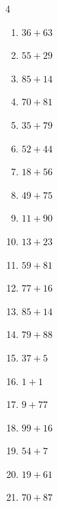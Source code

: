 \begin{multicols}{4}
\begin{enumerate}
  \item $36+63$
        \phantom{$=99$}

  \item $55+29$
        \phantom{$=84$}

  \item $85+14$
        \phantom{$=99$}

  \item $70+81$
        \phantom{$=151$}

  \item $35+79$
        \phantom{$=114$}

\columnbreak %

  \item $52+44$
        \phantom{$=96$}

  \item $18+56$
        \phantom{$=74$}

  \item $49+75$
        \phantom{$=124$}

  \item $11+90$
        \phantom{$=101$}

  \item $13+23$
        \phantom{$=36$}

  \item $59+81$
        \phantom{$=140$}

  \item $77+16$
        \phantom{$=93$}

  \item $85+14$
        \phantom{$=99$}

  \item $79+88$
        \phantom{$=167$}

  \item $37+5$
        \phantom{$=42$}

  \item $1+1$
        \phantom{$=2$}

  \item $9+77$
        \phantom{$=86$}

  \item $99+16$
        \phantom{$=115$}

  \item $54+7$
        \phantom{$=61$}

  \item $19+61$
        \phantom{$=80$}

  \item $70+87$
        \phantom{$=157$}


\end{enumerate}
\end{multicols}
